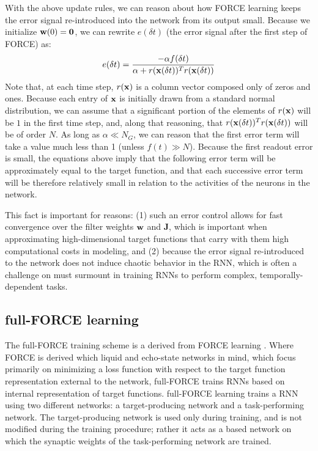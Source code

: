 \documentclass[12pt,a4paper,final]{iopart}
\begin{document}
With the above update rules, we can reason about how FORCE learning keeps the error signal re-introduced into the network from its output small. Because we initialize ${\bf w}(0) = \boldsymbol{0}$, we can rewrite $e(\delta t)$ (the error signal after the first step of FORCE) as:
\[
    e(\delta t) = \frac{-\alpha f(\delta t)}{\alpha + r({\bf x}(\delta t))^T r({\bf x}(\delta t))}
\]
Note that, at each time step, $r({\bf x})$ is a column vector composed only of zeros and ones. Because each entry of ${\bf x}$ is initially drawn from a standard normal distribution, we can assume that a significant portion of the elements of $r({\bf x})$ will be $1$ in the first time step, and, along that reasoning, that $r({\bf x}(\delta t))^T r({\bf x}(\delta t))$ will be of order $N$. As long as $\alpha \ll N_G$, we can reason that the first error term will take a value much less than 1 (unless $f(t) \gg N$). Because the first readout error is small, the equations above imply that the following error term will be approximately equal to the target function, and that each successive error term will be therefore relatively small in relation to the activities of the neurons in the network. 

This fact is important for reasons: (1) such an error control allows for fast convergence over the filter weights ${\bf w}$ and $\boldsymbol{J}$, which is important when approximating high-dimensional target functions that carry with them high computational costs in modeling, and (2) because the error signal re-introduced to the network does not induce chaotic behavior in the RNN, which is often a challenge on must surmount in training RNNs to perform complex, temporally-dependent tasks.

\subsection{full-FORCE learning}
The full-FORCE training scheme is a derived from FORCE learning \cite{DePasquale}. Where FORCE is derived which liquid and echo-state networks in mind, which focus primarily on minimizing a loss function with respect to the target function representation external to the network, full-FORCE trains RNNs based on internal representation of target functions. full-FORCE learning trains a RNN using two different networks: a target-producing network and a task-performing network. The target-producing network is used only during training, and is not modified during the training procedure; rather it acts as a based network on which the synaptic weights of the task-performing network are trained.
\end{document}
